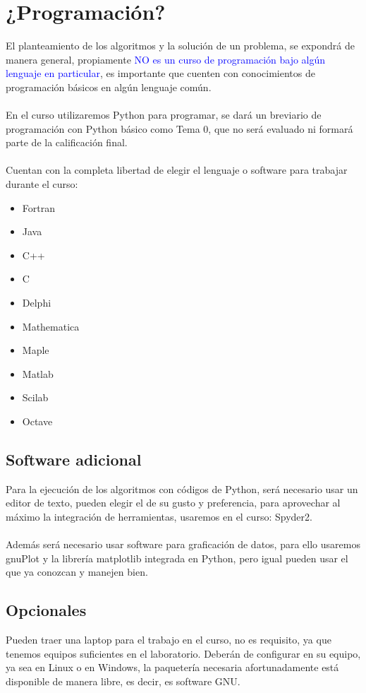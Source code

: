 \documentclass[12pt]{article}
\begin{document}
\section{¿Programaci\'{o}n?}
El planteamiento de los algoritmos y la soluci\'{o}n de un problema, se expondr\'{a} de manera general, propiamente \textcolor{blue}{NO es un curso de programación bajo alg\'{u}n lenguaje en particular}, es importante que cuenten con conocimientos de programaci\'{o}n b\'{a}sicos en alg\'{u}n lenguaje com\'{u}n.
\\
\\
En el curso utilizaremos Python para programar, se dar\'{a} un breviario de programaci\'{o}n con Python b\'{a}sico como Tema 0, que no ser\'{a} evaluado ni formar\'{a} parte de la calificaci\'{o}n final.
\\
\\
Cuentan con la completa libertad de elegir el lenguaje o software para trabajar durante el curso:
\begin{multicols}{2}
\begin{itemize}
\item Fortran
\item Java
\item C++
\item C
\item Delphi
\item Mathematica
\item Maple
\item Matlab
\item Scilab
\item Octave
\end{itemize}
\end{multicols}
\subsection{Software adicional}
Para la ejecuci\'{o}n de los algoritmos con c\'{o}digos de Python, ser\'{a} necesario usar un editor de texto, pueden elegir el de su gusto y preferencia, para aprovechar al m\'{a}ximo la integraci\'{o}n de herramientas, usaremos en el curso: Spyder2.
\\
\\
Adem\'{a}s ser\'{a} necesario usar software para graficaci\'{o}n de datos, para ello usaremos gnuPlot y la librer\'{i}a matplotlib integrada en Python, pero igual pueden usar el que ya conozcan y manejen bien.
\subsection{Opcionales}
Pueden traer una laptop para el trabajo en el curso, no es requisito, ya que tenemos equipos suficientes en el laboratorio. Deber\'{a}n de configurar en su equipo, ya sea en Linux o en Windows, la paqueter\'{i}a necesaria afortunadamente est\'{a} disponible de manera libre, es decir, es software GNU.
\end{document}

